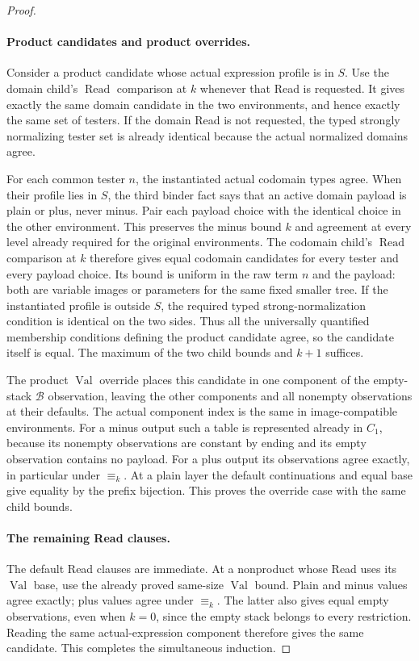 \begin{proof}
\paragraph{Product candidates and product overrides.}
\label{obs:bound-products}
Consider a product candidate whose actual expression profile is in $S$.
Use the domain child's $\operatorname{Read}$ comparison at $k$ whenever
that Read is requested.  It gives exactly the same domain candidate in
the two environments, and hence exactly the same set of testers.  If
the domain Read is not requested, the typed strongly normalizing tester
set is already identical because the actual normalized domains agree.

For each common tester $n$, the instantiated actual codomain types
agree.  When their profile lies in $S$, the third binder fact says
that an active domain payload is plain or plus, never minus.  Pair
each payload choice with the identical choice in the other environment.
This preserves the minus bound $k$ and agreement at every level
already required for the original environments.  The codomain child's
$\operatorname{Read}$ comparison at $k$ therefore gives equal codomain
candidates for every tester and every payload choice.  Its bound is
uniform in the raw term $n$ and the payload: both are variable images
or parameters for the same fixed smaller tree.  If the instantiated
profile is outside $S$, the required typed strong-normalization
condition is identical on the two sides.  Thus all the universally
quantified membership conditions defining the product candidate agree,
so the candidate itself is equal.  The maximum of the two child bounds
and $k+1$ suffices.

The product $\operatorname{Val}$ override places this candidate in one
component of the empty-stack $\mathcal B$ observation, leaving the
other components and all nonempty observations at their defaults.
The actual component index is the same in image-compatible environments.
For a minus output such a table is represented already in $C_1$,
because its nonempty observations are constant by ending and its empty
observation contains no payload.  For a plus output its observations
agree exactly, in particular under $\equiv_k$.  At a plain layer the
default continuations and equal base give equality by the prefix
bijection.  This proves the override case with the same child bounds.

\paragraph{The remaining Read clauses.}
\label{obs:bound-read}
The default Read clauses are immediate.  At a nonproduct whose Read
uses its $\operatorname{Val}$ base, use the already proved
same-size $\operatorname{Val}$ bound.  Plain and minus values agree
exactly; plus values agree under $\equiv_k$.  The latter also gives
equal empty observations, even when $k=0$, since the empty stack
belongs to every restriction.  Reading the same actual-expression
component therefore gives the same candidate.  This completes the
simultaneous induction.
\end{proof}

